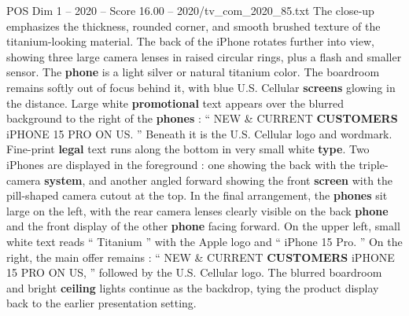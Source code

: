 \begin{textsample}{POS Dim 1 – 2020 – Score 16.00 – 2020/tv\_com\_2020\_85.txt}
The close-up emphasizes the thickness, rounded corner, and smooth brushed texture of the titanium-looking material.
The back of the iPhone rotates further into view, showing three large camera lenses in raised circular rings, plus a flash and smaller sensor.
The \textbf{phone} is a light silver or natural titanium color.
The boardroom remains softly out of focus behind it, with blue U.S.
Cellular \textbf{screens} glowing in the distance.
Large white \textbf{promotional} text appears over the blurred background to the right of the \textbf{phones} : “ NEW \& CURRENT \textbf{CUSTOMERS} iPHONE 15 PRO ON US. ” Beneath it is the U.S.
Cellular logo and wordmark.
Fine-print \textbf{legal} text runs along the bottom in very small white \textbf{type}.
Two iPhones are displayed in the foreground : one showing the back with the triple-camera \textbf{system}, and another angled forward showing the front \textbf{screen} with the pill-shaped camera cutout at the top.
In the final arrangement, the \textbf{phones} sit large on the left, with the rear camera lenses clearly visible on the back \textbf{phone} and the front display of the other \textbf{phone} facing forward.
On the upper left, small white text reads “ Titanium ” with the Apple logo and “ iPhone 15 Pro. ” On the right, the main offer remains : “ NEW \& CURRENT \textbf{CUSTOMERS} iPHONE 15 PRO ON US, ” followed by the U.S.
Cellular logo.
The blurred boardroom and bright \textbf{ceiling} lights continue as the backdrop, tying the product display back to the earlier presentation setting.

\end{textsample}
